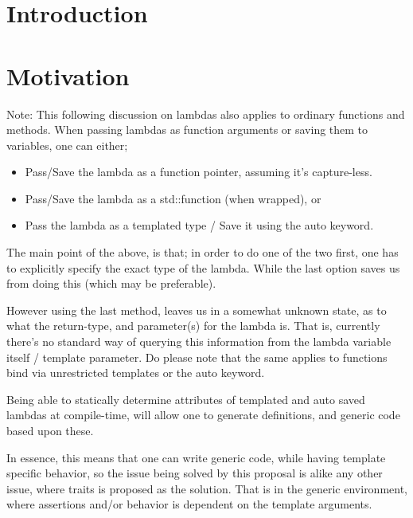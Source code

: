 
\tableofcontents

\section{Introduction}


\section{Motivation}
Note: This following discussion on lambdas also applies to ordinary functions
and methods.
\newline\newline
When passing lambdas as function arguments or saving them to variables, one can either;
\begin{itemize}
\item Pass/Save the lambda as a function pointer, assuming it's capture-less.
\item Pass/Save the lambda as a std::function (when wrapped), or
\item Pass the lambda as a templated type / Save it using the auto keyword.
\end{itemize}
The main point of the above, is that; in order to do one of the two first,
one has to explicitly specify the exact type of the lambda.
While the last option saves us from doing this (which may be preferable).

However using the last method, leaves us in a somewhat unknown state, as to what
the return-type, and parameter(s) for the lambda is. That is, currently there's
no standard way of querying this information from the lambda variable itself /
template parameter. Do please note that the same applies to functions bind via
unrestricted templates or the auto keyword.

Being able to statically determine attributes of templated and auto saved
lambdas at compile-time, will allow one to generate definitions, and generic
code based upon these.

In essence, this means that one can write generic code, while having template
specific behavior, so the issue being solved by this proposal is alike any other
issue, where traits is proposed as the solution. That is in the generic environment,
where assertions and/or behavior is dependent on the template arguments.

